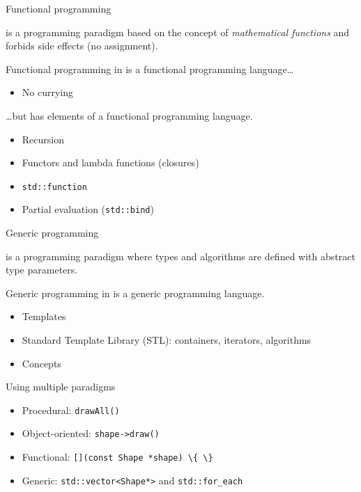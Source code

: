 \begin{frame}{Functional programming}{}
  \begin{definition}
     is a programming paradigm based on the concept of \emph{mathematical functions} and forbids side effects (no assignment).
  \end{definition}
  \begin{block}{Functional programming in \CCLang}
    \CCLang is  a functional programming language\ldots
    \begin{itemize}
    \item
      No currying
    \end{itemize}
    \ldots but has elements of a functional programming language.
    \begin{itemize}
    \item
      Recursion
    \item
      Functors and lambda functions (closures)
    \item
      \lstinline!std::function!
    \item
      Partial evaluation (\lstinline!std::bind!)
    \end{itemize}
  \end{block}
\end{frame}

\begin{frame}{Generic programming}{}
  \begin{definition}
     is a programming paradigm where types and algorithms are defined with abstract type parameters.
  \end{definition}
  \begin{block}{Generic programming in \CCLang}
    \CCLang is a generic programming language.
    \begin{itemize}
    \item
      Templates
    \item
      Standard Template Library (STL): containers, iterators, algorithms
    \item
      Concepts
    \end{itemize}
  \end{block}
\end{frame}

\begin{frame}{Using multiple paradigms}{}
  \begin{example}

    \begin{itemize}
    \item
      Procedural: \lstinline!drawAll()!
    \item
      Object-oriented: \lstinline!shape->draw()!
    \item
      Functional: \lstinline![](const Shape *shape) \{ \}!
    \item
      Generic: \lstinline!std::vector<Shape*>! and \lstinline!std::for_each!
    \end{itemize}
  \end{example}
\end{frame}


